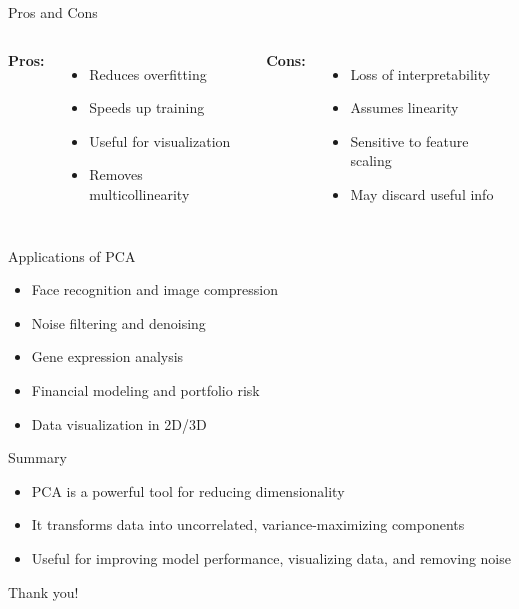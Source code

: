 \documentclass{beamer}
\begin{document}
\begin{frame}{ Pros and  Cons}
\begin{columns}
\textbf{Pros:}
\begin{itemize}
    \item Reduces overfitting
    \item Speeds up training
    \item Useful for visualization
    \item Removes multicollinearity
\end{itemize}

\textbf{Cons:}
\begin{itemize}
    \item Loss of interpretability
    \item Assumes linearity
    \item Sensitive to feature scaling
    \item May discard useful info
\end{itemize}
\end{columns}
\end{frame}

\begin{frame}{Applications of PCA}
\begin{itemize}
    \item Face recognition and image compression
    \item Noise filtering and denoising
    \item Gene expression analysis
    \item Financial modeling and portfolio risk
    \item Data visualization in 2D/3D
\end{itemize}
\end{frame}

\begin{frame}{Summary}
\begin{itemize}
    \item PCA is a powerful tool for reducing dimensionality
    \item It transforms data into uncorrelated, variance-maximizing components
    \item Useful for improving model performance, visualizing data, and removing noise
\end{itemize}
\end{frame}

\begin{frame}[standout]
    Thank you!
\end{frame}
\end{document}
